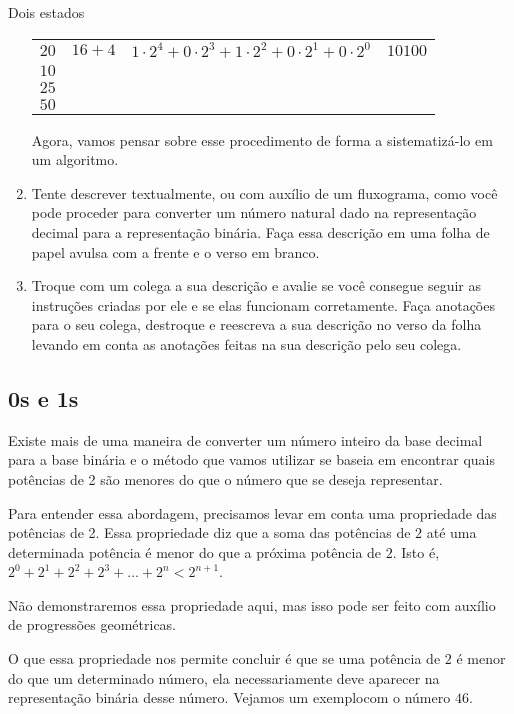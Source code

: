 \begin{task}{Dois estados}
\begin{enumerate}
\begin{table}[H]
\begin{tabular}{|e{.175\linewidth}|e{.15\linewidth}|c|e{.175\linewidth}|}
\hline
{} &  &  &  \tabularnewline
\hline
$20$ & $16+4$ & $1\cdot2^4+0\cdot2^3+1\cdot2^2+0\cdot2^1+0\cdot2^0$ & $10100$ \tabularnewline
\hline
$10$ & & & \tabularnewline
\hline
$25$ & & & \tabularnewline
\hline
$50$ & & & \tabularnewline
\hline
\end{tabular}
\end{table}

Agora, vamos pensar sobre esse procedimento de forma a sistematizá-lo em um algoritmo.

\item Tente descrever textualmente, ou com auxílio de um fluxograma, como você pode proceder para converter um número natural dado na representação decimal para a representação binária. Faça essa descrição em uma folha de papel avulsa com a frente e o verso em branco.

\item Troque com um colega a sua descrição e avalie se você consegue seguir as instruções criadas por ele e se elas funcionam corretamente. Faça anotações para o seu colega, destroque e reescreva a sua descrição no verso da folha levando em conta as anotações feitas na sua descrição pelo seu colega.
\end{enumerate}
\end{task}

\subsection{0s e 1s}

Existe mais de uma maneira de converter um número inteiro da base decimal para a base binária e o método que vamos utilizar se baseia em encontrar quais potências de 2 são menores do que o número que se deseja representar.

Para entender essa abordagem, precisamos levar em conta uma propriedade das potências de 2. Essa propriedade diz que a soma das potências de $2$ até uma determinada potência  é menor do que a próxima potência de $2$. Isto é, $2^0+2^1+2^2+2^3+\dots+2^n<2^{n+1}$.

Não demonstraremos essa propriedade aqui, mas isso pode ser feito com auxílio de progressões geométricas.

O que essa propriedade nos permite concluir é que se uma potência de $2$ é menor do que um determinado número, ela necessariamente deve aparecer na representação binária desse número. Vejamos um exemplocom o número $46$.

